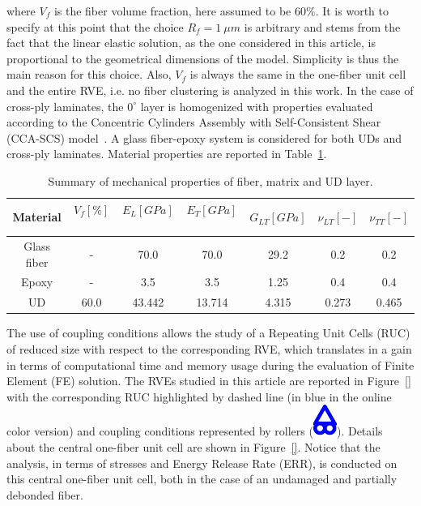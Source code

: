 \documentclass[12pt,a4paper]{article}
\begin{document}
where $V_{f}$ is the fiber volume fraction, here assumed to be $60\%$. It is worth to specify at this point that the choice $R_{f}=1\ \mu m$ is arbitrary and stems from the fact that the linear elastic solution, as the one considered in this article, is proportional to the geometrical dimensions of the model. Simplicity is thus the main reason for this choice. Also, $V_{f}$ is always the same in the one-fiber unit cell and the entire RVE, i.e. no fiber clustering is analyzed in this work. In the case of cross-ply laminates, the $0^{\circ}$ layer is homogenized with properties evaluated according to the Concentric Cylinders Assembly with Self-Consistent Shear (CCA-SCS) model~\cite{Hashin1983,Christensen1979}. A glass fiber-epoxy system is considered for both UDs and cross-ply laminates. Material properties are reported in Table~\ref{tab:phaseprop}.

\begin{table}[!htbp]
 \centering
 \caption{Summary of mechanical properties of fiber, matrix and UD layer.}%
 \begin{tabular}{ccccccc}
\textbf{Material} & \textbf{$V_{f}\left[\%\right]$}\  & \textbf{$E_{L}\left[GPa\right]$}\ & \textbf{$E_{T}\left[GPa\right]$}\  & \textbf{$G_{LT}\left[GPa\right]$} &\textbf{$\nu_{LT}\left[-\right]$} & \textbf{$\nu_{TT}\left[-\right]$} \\
\midrule
Glass fiber &-   & 70.0 & 70.0  & 29.2 & 0.2  & 0.2\\
Epoxy    &-& 3.5 & 3.5   & 1.25 &  0.4& 0.4\\
UD&60.0&43.442&13.714& 4.315& 0.273&0.465\\
\end{tabular}
\label{tab:phaseprop}
\end{table}

The use of coupling conditions allows the study of a Repeating Unit Cells (RUC) of reduced size with respect to the corresponding RVE, which translates in a gain in terms of computational time and memory usage during the evaluation of Finite Element (FE) solution. The RVEs studied in this article are reported in Figure~\ref{} with the corresponding RUC highlighted by dashed line (in blue in the online color version) and coupling conditions represented by rollers (\includegraphics[scale=0.5]{roller.pdf}). Details about the central one-fiber unit cell are shown in Figure~\ref{}. Notice that the analysis, in terms of stresses and Energy Release Rate (ERR), is conducted on this central one-fiber unit cell, both in the case of an undamaged and partially debonded fiber.
\end{document}
